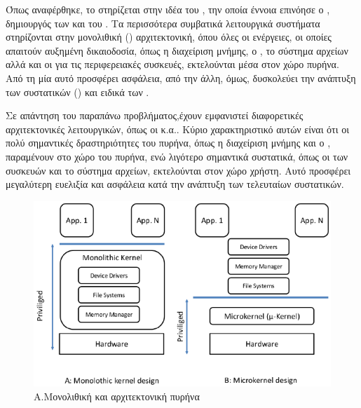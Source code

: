 Όπως αναφέρθηκε, το  στηρίζεται στην ιδέα του
, την οποία έννοια επινόησε ο \cite{interviewKantee}, δημιουργός
των  και του . Τα περισσότερα συμβατικά λειτουργικά συστήματα
στηρίζονται στην μονολιθική () αρχιτεκτονική, όπου όλες
οι ενέργειες, οι οποίες απαιτούν αυξημένη δικαιοδοσία, όπως η διαχείριση
μνήμης, ο , το σύστημα αρχείων αλλά και οι  για
τις περιφερειακές συσκευές, εκτελούνται μέσα στον χώρο πυρήνα.
Από τη μία αυτό προσφέρει ασφάλεια, από την άλλη, όμως, δυσκολεύει
την ανάπτυξη των συστατικών () και ειδικά των .
\newline

Σε απάντηση του παραπάνω προβλήματος,έχουν εμφανιστεί διαφορετικές
αρχιτεκτονικές λειτουργικών, όπως οι  κ.α..
Κύριο χαρακτηριστικό αυτών είναι ότι οι πολύ σημαντικές
δραστηριότητες του πυρήνα, όπως η διαχείριση μνήμης και ο
, παραμένουν στο χώρο του πυρήνα, ενώ λιγότερο σημαντικά
συστατικά, όπως οι  των συσκευών και το σύστημα αρχείων,
εκτελούνται στον χώρο χρήστη. Αυτό προσφέρει μεγαλύτερη ευελιξία
και ασφάλεια κατά την ανάπτυξη των τελευταίων συστατικών.
\newline

\begin{figure}[h]
  \includegraphics[width=\textwidth]{pictures/mono-micro_kernels.png}
  \caption{Α.Μονολιθική και  αρχιτεκτονική πυρήνα}
  \label{fig:microkernels}
\end{figure}

